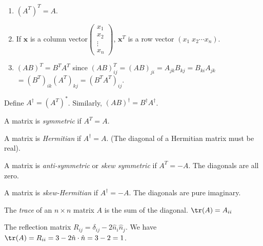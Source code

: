 \documentclass[a4paper]{article}
\begin{document}
\begin{prop}\leavevmode
  \begin{enumerate}
    \item $(A^T)^T = A$.
    \item If $\mathbf{x}$ is a column vector$\begin{pmatrix}x_1\\x_2\\\vdots\\x_n\end{pmatrix}$, $\mathbf{x}^T$ is a row vector $(x_1\; x_2\cdots x_n)$.
    \item $(AB)^T = B^TA^T$ since $(AB)^T_{ij} = (AB)_{ji} = A_{jk}B_{kj} = B_{ki}A_{jk} $\\$= (B^T)_{ik}(A^T)_{kj} = (B^TA^T)_{ij}$.
  \end{enumerate}
\end{prop}

\begin{defi}
  Define $A^{\dagger} = (A^T)^*$. Similarly, $(AB)^\dagger = B^\dagger A^\dagger$.
\end{defi}

\begin{defi}
  A matrix is \emph{symmetric} if $A^T = A$.
\end{defi}

\begin{defi}
  A matrix is \emph{Hermitian} if $A^\dagger = A$. (The diagonal of a Hermitian matrix must be real).
\end{defi}

\begin{defi}
  A matrix is \emph{anti-symmetric} or \emph{skew symmetric} if $A^T = -A$. The diagonals are all zero.
\end{defi}

\begin{defi}
  A matrix is \emph{skew-Hermitian} if $A^\dagger = -A$. The diagonals are pure imaginary.
\end{defi}

\begin{defi}
  The \emph{trace} of an $n\times n$ matrix $A$ is the sum of the diagonal. $\tr(A) = A_{ii}$
\end{defi}

\begin{eg}
  The reflection matrix $R_{ij} = \delta_{ij} - 2\hat n_i \hat n_j$. We have $\tr(A) = R_{ii} = 3 - 2\hat{n}\cdot \hat{n} = 3 - 2 = 1$.
\end{eg}
\end{document}
